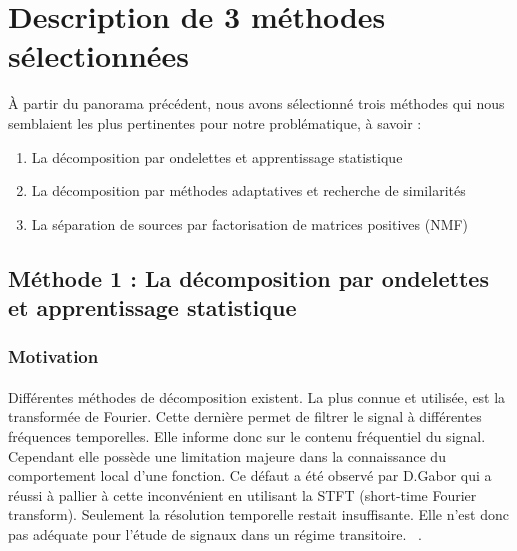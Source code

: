 \section{Description de 3 méthodes sélectionnées}
À partir du panorama précédent, nous avons sélectionné trois méthodes qui nous semblaient les plus pertinentes pour notre problématique, à savoir :

\begin{enumerate}
    \item La décomposition par ondelettes et apprentissage statistique
    \item La décomposition par méthodes adaptatives et recherche de similarités
    \item La séparation de sources par factorisation de matrices positives (NMF)
\end{enumerate}

\subsection{Méthode 1 : La décomposition par ondelettes et apprentissage statistique }
\subsubsection{Motivation}
\paragraph{}
Différentes méthodes de décomposition existent.
La plus connue et utilisée, est la transformée de Fourier. Cette dernière permet de filtrer le signal à différentes fréquences temporelles. Elle informe donc sur le contenu fréquentiel du signal.
Cependant elle possède une limitation majeure dans la connaissance du comportement local d'une fonction.
Ce défaut a été observé par D.Gabor qui a réussi à pallier à cette inconvénient en utilisant la STFT (short-time Fourier transform). Seulement la résolution temporelle restait insuffisante.
Elle n'est donc pas adéquate pour l'étude de signaux dans un régime transitoire. ~\cite{GaoR}.
